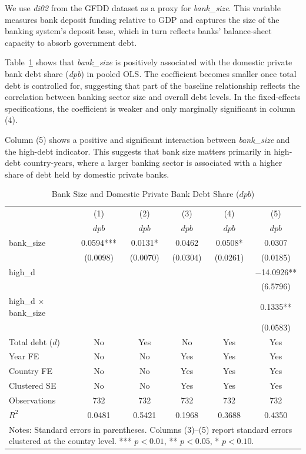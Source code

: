 \documentclass[\latexroot/\projectname]{subfiles}
\begin{document}
We use \textit{di02} from the GFDD dataset as a proxy for \textit{bank\_size}. This variable measures bank deposit funding relative to GDP and captures the size of the banking system's deposit base, which in turn reflects banks' balance-sheet capacity to absorb government debt.

Table~\ref{tab:bank} shows that \textit{bank\_size} is positively associated with the domestic private bank debt share (\textit{dpb}) in pooled OLS. The coefficient becomes smaller once total debt is controlled for, suggesting that part of the baseline relationship reflects the correlation between banking sector size and overall debt levels. In the fixed-effects specifications, the coefficient is weaker and only marginally significant in column (4).

Column (5) shows a positive and significant interaction between \textit{bank\_size} and the high-debt indicator. This suggests that bank size matters primarily in high-debt country-years, where a larger banking sector is associated with a higher share of debt held by domestic private banks.

\begin{table}[htbp]\centering
\caption{Bank Size and Domestic Private Bank Debt Share ($dpb$)}
\label{tab:bank}
\begin{tabular}{lccccc}
\toprule
 & (1) & (2) & (3) & (4) & (5) \\
 & $dpb$ & $dpb$ & $dpb$ & $dpb$ & $dpb$ \\
\midrule
bank\_size 
& 0.0594*** & 0.0131* & 0.0462 & 0.0508* & 0.0307 \\
& (0.0098) & (0.0070) & (0.0304) & (0.0261) & (0.0185) \\

high\_d
&  &  &  &  & $-$14.0926** \\
&  &  &  &  & (6.5796) \\

high\_d $\times$ bank\_size
&  &  &  &  & 0.1335** \\
&  &  &  &  & (0.0583) \\

\midrule
Total debt ($d$) & No & Yes & No & Yes & Yes \\
Year FE          & No & No  & Yes & Yes & Yes \\
Country FE       & No & No  & Yes & Yes & Yes \\
Clustered SE     & No & No  & Yes & Yes & Yes \\

\midrule
Observations & 732 & 732 & 732 & 732 & 732 \\
$R^2$        & 0.0481 & 0.5421 & 0.1968 & 0.3688 & 0.4350 \\
\bottomrule
\multicolumn{6}{p{0.92\linewidth}}{\footnotesize Notes: Standard errors in parentheses. Columns (3)--(5) report standard errors clustered at the country level. *** $p<0.01$, ** $p<0.05$, * $p<0.10$.}
\end{tabular}
\end{table}
\end{document}

